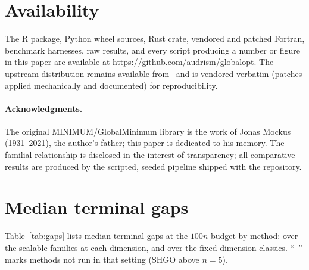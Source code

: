 \section{Availability}
\label{sec:availability}

The R package, Python wheel sources, Rust crate, vendored and patched
Fortran, benchmark harnesses, raw results, and every script producing a
number or figure in this paper are available at
\url{https://github.com/audrism/globalopt}. The upstream distribution
remains available from~\cite{globalminimumfortran} and is vendored
verbatim (patches applied mechanically and documented) for
reproducibility.

\paragraph{Acknowledgments.} The original MINIMUM/GlobalMinimum library
is the work of Jonas Mockus (1931--2021), the author's father; this
paper is dedicated to his memory. The familial relationship is
disclosed in the interest of transparency; all comparative results are
produced by the scripted, seeded pipeline shipped with the repository.

\appendix
\section{Median terminal gaps}
\label{app:gaps}

Table~\ref{tab:gaps} lists median terminal gaps at the $100n$ budget by
method: over the scalable families at each dimension, and over the
fixed-dimension classics. ``--'' marks methods not run in that setting
(SHGO above $n=5$).

\begin{table}[h]
\centering\small

\caption{Median gap to the global optimum at budget $100n$.}
\label{tab:gaps}
\end{table}

